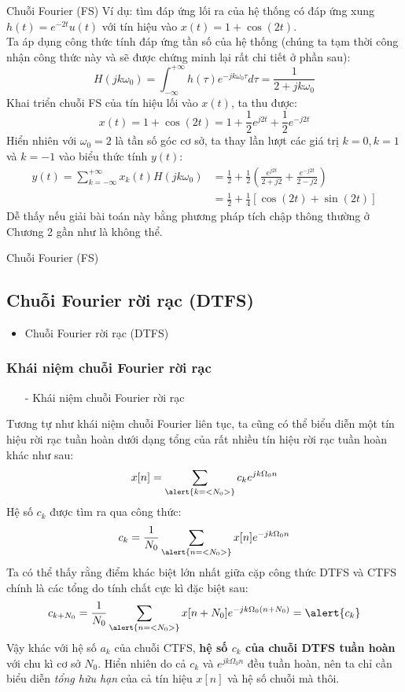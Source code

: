 \documentclass[8pt]{beamer}
\begin{document}
\begin{frame}{Chuỗi Fourier (FS)}
	Ví dụ: tìm đáp ứng lối ra của hệ thống có đáp ứng xung $h(t)=e^{-2t}u(t)$ với tín hiệu vào $x(t)=1+\cos{(2t)}$. 
	\\ Ta áp dụng công thức tính \alert{đáp ứng tần số của hệ thống} (chúng ta tạm thời công nhận công thức này và sẽ được chứng minh lại rất chi tiết ở phần sau):
	$$H(jk\omega_{0})=\int_{-\infty}^{+\infty}h(\tau)e^{-jk\omega_{0}\tau}d\tau=\frac{1}{2+jk\omega_{0}}$$
Khai triển chuỗi FS của tín hiệu lối vào $x(t)$, ta thu được:
$$x(t)=1+\cos{(2t)}=1+\frac{1}{2}e^{j2t}+\frac{1}{2}e^{-j2t}$$
Hiển nhiên với $\omega_{0}=2$ là tần số góc cơ sở, ta thay lần lượt các giá trị $k=0,k=1$ và $k=-1$ vào biểu thức tính $y(t)$:
\begin{equation*}
\begin{split}
	y(t)=\sum_{k=-\infty}^{+\infty}x_{k}(t)H(jk\omega_{0})&=\frac{1}{2}+\frac{1}{2}\left(\frac{e^{j2t}}{2+j2}+\frac{e^{-j2t}}{2-j2}\right)\\
							      &=\frac{1}{2}+\frac{1}{4}[\cos{(2t)}+\sin{(2t)}]
\end{split}
\end{equation*}
Dễ thấy nếu giải bài toán này bằng phương pháp tích chập thông thường ở \alert{Chương 2} gần như là không thể.
\end{frame}
\begin{frame}{Chuỗi Fourier (FS)}
\subsection{Chuỗi Fourier rời rạc (DTFS)}
\begin{itemize}
	\item  Chuỗi Fourier rời rạc (DTFS)
\end{itemize}
\subsubsection{Khái niệm chuỗi Fourier rời rạc}
\begin{itemize}
	\item[-] Khái niệm chuỗi Fourier rời rạc
\end{itemize}
Tương tự như khái niệm chuỗi Fourier liên tục, ta cũng có thể biểu diễn một tín hiệu rời rạc tuần hoàn dưới dạng tổng của rất nhiều tín hiệu rời rạc tuần hoàn khác như sau:
$$x[n]=\sum_{\alert{k=<N_{0}>}}c_{k}e^{jk\Omega_{0}n}$$
Hệ số $c_{k}$ được tìm ra qua công thức:
$$c_{k}=\frac{1}{N_{0}}\sum_{\alert{n=<N_{0}>}}x[n]e^{-jk\Omega_{0}n}$$
Ta có thể thấy rằng điểm khác biệt lớn nhất giữa cặp công thức DTFS và CTFS chính là các tổng  do tính chất cực kì đặc biệt sau:
$$c_{k+N_{0}}=\frac{1}{N_{0}}\sum_{\alert{n=<N_{0}>}}x[n+N_{0}]e^{-jk\Omega_{0}(n+N_{0})}=\alert{c_{k}}$$
Vậy khác với hệ số $a_{k}$ của chuỗi CTFS, \textbf{hệ số $c_{k}$ của chuỗi DTFS tuần hoàn} với chu kì cơ sở $N_{0}$. Hiển nhiên do cả $c_{k}$ và $e^{jk\Omega_{0}n}$ đều tuần hoàn, nên ta chỉ cần biểu diễn \textit{tổng hữu hạn} của cả tín hiệu $x[n]$ và hệ số chuỗi mà thôi.
\end{frame}
\end{document}
